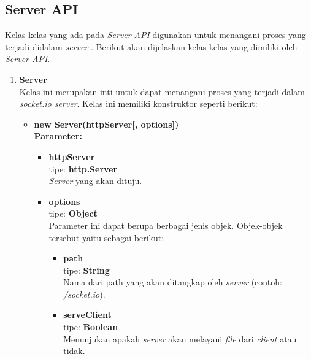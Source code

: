 \subsection{Server API}
Kelas-kelas yang ada pada \textit{Server API} digunakan untuk menangani proses yang terjadi didalam \textit{server} \cite{rauch:11:socketioserverapi}. Berikut akan dijelaskan kelas-kelas yang dimiliki oleh \textit{Server API}.

\begin{enumerate}
	\item \textbf{Server} \\ 
	Kelas ini merupakan inti untuk dapat menangani proses yang terjadi dalam \textit{socket.io server}. Kelas ini memiliki konstruktor seperti berikut: 
	\begin{itemize}
		\item \textbf{new Server(httpServer[, options])} \\ 
		\textbf{Parameter:}
		\begin{itemize}
			\item \textbf{httpServer} \\ tipe: \textbf{http.Server} \\ \textit{Server} yang akan dituju.
			\item \textbf{options} \\ tipe: \textbf{Object} \\ Parameter ini dapat berupa berbagai jenis objek. Objek-objek tersebut yaitu sebagai berikut: 
			\begin{itemize}
				\item \textbf{path} \\ tipe: \textbf{String} \\ Nama dari path yang akan ditangkap oleh \textit{server} (contoh: \textit{/socket.io}).
				
				\item \textbf{serveClient} \\ tipe: \textbf{Boolean} \\ Menunjukan apakah \textit{server} akan melayani \textit{file} dari \textit{client} atau tidak.
				
%				
				

\end{itemize}
\end{itemize}
\end{itemize}
\end{enumerate}
